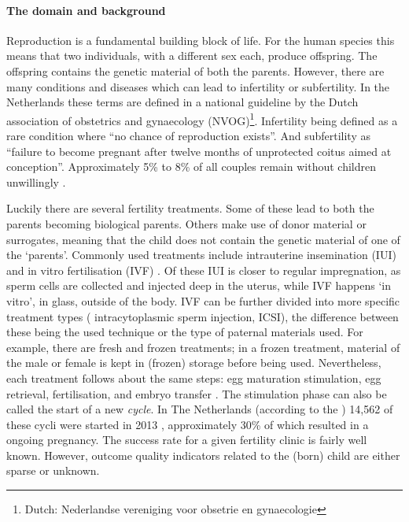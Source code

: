 \paragraph{The domain and background}
Reproduction is a fundamental building block of life.
For the human species this means that two individuals, with a different sex each, produce offspring.
The offspring contains the genetic material of both the parents.
However, there are many conditions and diseases which can lead to infertility or subfertility.
In the Netherlands these terms are defined in a national guideline by the Dutch association of obstetrics and gynaecology (NVOG)\footnote{Dutch: Nederlandse vereniging voor obsetrie en gynaecologie}\cite{subfertilityGuideline}.
Infertility being defined as a rare condition where ``no chance of reproduction exists''.
And subfertility as ``failure to become pregnant after twelve months of unprotected coitus aimed at conception''.
Approximately 5\% to 8\% of all couples remain without children unwillingly \cite{cbsStatistics, nhgStatistics}.

Luckily there are several fertility treatments.
Some of these lead to both the parents becoming biological parents. 
Others make use of donor material or surrogates, meaning that the child does not contain the genetic material of one of the `parents'.
Commonly used treatments include intrauterine insemination (IUI) and in vitro fertilisation (IVF) \cite{treatmentExplanation}.
Of these IUI is closer to regular impregnation, as sperm cells are collected and injected deep in the uterus, while IVF happens `in vitro', \ie{} in glass, outside of the body.
IVF can be further divided into more specific treatment types (\eg{} intracytoplasmic sperm injection, ICSI), 
the difference between these being the used technique or the type of paternal  materials used.
For example, there are fresh and frozen treatments; in a frozen treatment, material of the male or female is kept in (frozen) storage before being used.
Nevertheless, each treatment follows about the same steps: egg maturation stimulation, egg retrieval, fertilisation, and embryo transfer \cite{treatmentExplanation}.
The stimulation phase can also be called the start of a new \emph{cycle}. In The Netherlands (according to the ) 14,562 of these cycli were started in 2013 \cite{ivfReportNVOG2013}, approximately 30\% of which resulted in a ongoing pregnancy.
The success rate for a given fertility clinic is fairly well known.
However, outcome quality indicators related to the (born) child are either sparse or unknown.

